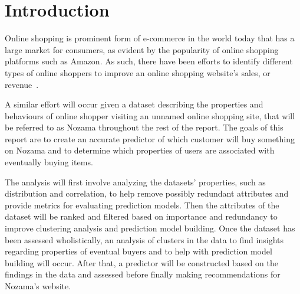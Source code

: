 \documentclass[../cmpe-251-project-report.tex]{subfiles}
\begin{document}
  \chapter{Introduction}
  Online shopping is prominent form of e-commerce in the world today that has a large market for consumers, as evident by the popularity of online shopping platforms such as Amazon. As such, there have been efforts to identify different types of online shoppers to improve an online shopping website's sales, or revenue~\cite{rohm_typology_2004}.

  A similar effort will occur given a dataset describing the properties and behaviours of online shopper visiting an unnamed online shopping site, that will be referred to as Nozama throughout the rest of the report. The goals of this report are to create an accurate predictor of which customer will buy something on Nozama and to determine which properties of users are associated with eventually buying items.

  The analysis will first involve analyzing the datasets' properties, such as distribution and correlation, to help remove possibly redundant attributes and provide metrics for evaluating prediction models. Then the attributes of the dataset will be ranked and filtered based on importance and redundancy to improve clustering analysis and prediction model building. Once the dataset has been assessed wholistically, an analysis of clusters in the data to find insights regarding properties of eventual buyers and to help with prediction model building will occur. After that, a predictor will be constructed based on the findings in the data and assessed before finally making recommendations for Nozama's website.
\end{document}

